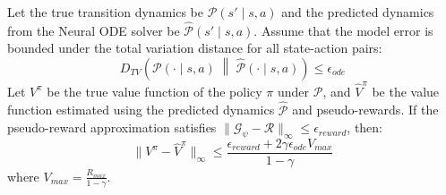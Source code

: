 \documentclass[manuscript, screen, review]{jair}
\begin{document}
\begin{theorem}
Let the true transition dynamics be $\mathcal{P}(s' \mid s, a)$ and the predicted dynamics from the Neural ODE solver be $\hat{\mathcal{P}}(s' \mid s, a)$. Assume that the model error is bounded under the total variation distance for all state-action pairs:
\begin{equation}
    D_{TV}\left( \mathcal{P}(\cdot \mid s, a) \;\middle\|\; \hat{\mathcal{P}}(\cdot \mid s, a) \right) \le \epsilon_{ode}
\end{equation}
Let $V^\pi$ be the true value function of the policy $\pi$ under $\mathcal{P}$, and $\hat{V}^\pi$ be the value function estimated using the predicted dynamics $\hat{\mathcal{P}}$ and pseudo-rewards. If the pseudo-reward approximation satisfies $\|\mathcal{G}_\psi - \mathcal{R}\|_\infty \le \epsilon_{reward}$, then:
\begin{equation}
    \| V^\pi - \hat{V}^\pi \|_\infty \le \frac{\epsilon_{reward} + 2 \gamma \epsilon_{ode} V_{max}}{1 - \gamma}
\end{equation}
where $V_{max} = \frac{R_{max}}{1-\gamma}$.
\end{theorem}
\end{document}
